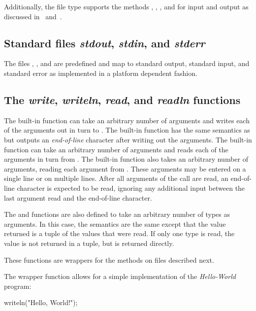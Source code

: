 Additionally, the file type supports the
methods , , , and  for 
input and output as discussed in~ and~.

\subsection{Standard files {\em stdout}, {\em stdin}, and {\em stderr}}

The files , , and  are
predefined and map to standard output, standard input, and standard
error as implemented in a platform dependent fashion.

\subsection{The {\em write}, {\em writeln}, {\em read}, and {\em readln} 
functions}

The built-in function  can take an arbitrary number of
arguments and writes each of the arguments out in turn
to .  The built-in function  has the same
semantics as  but outputs an {\em end-of-line} character
after writing out the arguments.  The built-in function 
can take an arbitrary number of arguments and reads each of the
arguments in turn from .  The built-in function 
also takes an arbitrary number of arguments, reading each argument from
.  These arguments may be entered on a single line or on multiple
lines.  After all arguments of the  call are read, an 
end-of-line character is expected to be read, ignoring any additional 
input between the last argument read and the end-of-line character.

The  and  functions are also defined to take
an arbitrary number of types as arguments.  In this case, the
semantics are the same except that the value returned is a tuple of
the values that were read.  If only one type is read, the value is not
returned in a tuple, but is returned directly.

These functions are wrappers for the methods on files described next.

\begin{example}
The  wrapper function allows for a simple implementation
of the {\em Hello-World} program:
\begin{chapel}
writeln("Hello, World!");
\end{chapel}
\end{example}

